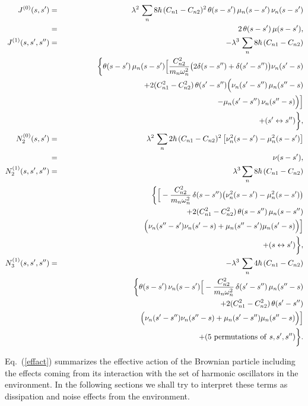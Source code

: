 \documentclass[%
amssymb,preprint,preprintnumbers,nofootinbib,superscriptaddress]{revtex4}
\begin{document}
\begin{eqnarray}
J^{(0)}(s,s')&=&\lambda^{2}\,\sum_{n}8\hbar\,(C_{n1}-C_{n2})^{2}\,\theta(s-s')\,\mu_{n}(s-s')\,\nu_{n}(s-s')\nonumber\\
&=&2\,\theta(s-s')\,\mu(s-s'),\nonumber\\
J^{(1)}(s,s',s'')&=&-\lambda^{3}\,\sum_{n}8\hbar\,(C_{n1}-C_{n2})\nonumber\\
&&\bigg\{\theta(s-s')\,\mu_{n}(s-s')\Big[\frac{C_{n2}^{2}}{m_{n}\omega_{n}^{2}}\big(2\delta(s-s'')+\delta(s'-s'')\big)\nu_{n}(s'-s)\nonumber\\
&&\ \ \ \ \ \ +2(C_{n1}^{2}-C_{n2}^{2})\,\theta(s'-s'')\Big(\nu_{n}(s'-s'')\,\mu_{n}(s''-s)\nonumber\\
&&\hskip 180pt
-\mu_{n}(s'-s'')\,\nu_{n}(s''-s)\Big)\Big]\nonumber\\
&&\hskip 50pt 
+(s'\leftrightarrow s'')\bigg\}, \label{Jkernels}
\\
N^{(0)}_{2}(s,s')&=&\lambda^{2}\,\sum_{n}2\hbar\,(C_{n1}-C_{n2})^{2}\left[\nu_{n}^{2}(s-s')-\mu_{n}^{2}(s-s')\right]\nonumber\\
&=&\nu(s-s'),\nonumber\\
N^{(1)}_{2}(s,s',s'')&=&\lambda^{3}\sum_{n}8\hbar\,(C_{n1}-C_{n2})\nonumber\\
&&\bigg\{\Big[-\frac{C_{n2}^{2}}{m_{n}\omega_{n}^{2}}\,\delta(s-s'')\big(\nu_{n}^{2}(s-s')-\mu_{n}^{2}(s-s')\big)\nonumber\\
&&\ \ \ \ \ \ +2(C_{n1}^{2}-C_{n2}^{2})\,\theta(s-s'')\,\mu_{n}(s-s'')\nonumber\\
&&\hskip 50pt \Big(\nu_{n}(s''-s')\nu_{n}(s'-s)+\mu_{n}(s''-s')\mu_{n}(s'-s)\Big)\Big]\nonumber\\
&&\hskip 70pt+(s\leftrightarrow s')\bigg\},\label{noisen2}\\ 
N^{(1)}_{3}(s,s',s'')&=&-\lambda^{3}\,\sum_{n}4\hbar\,(C_{n1}-C_{n2})\nonumber\\
&&\bigg\{\theta(s-s')\,\nu_{n}(s-s')\Big[-\frac{C_{n2}^{2}}{m_{n}\omega^{2}_{n}}\,\delta(s'-s'')\,\mu_{n}(s''-s)\nonumber\\
&&\hskip 120pt +2(C_{n1}^{2}-C_{n2}^{2})\,\theta(s'-s'')\nonumber\\
&&\hskip 100pt \Big(\nu_{n}(s'-s'')\nu_{n}(s''-s)+\mu_{n}(s'-s'')\mu_{n}(s''-s)\Big)\Big]\nonumber\\
&&\hskip 50pt +(5\ {\rm permutations\ of\ } s,s',s'')\bigg\}.\label{kerter}
\end{eqnarray}

Eq.~(\ref{effact}) summarizes the effective action of the Brownian particle including the effects coming from its interaction with the set of harmonic oscillators in the environment. In the following sections we shall try to interpret these terms as dissipation and noise effects from the environment.
\end{document}
